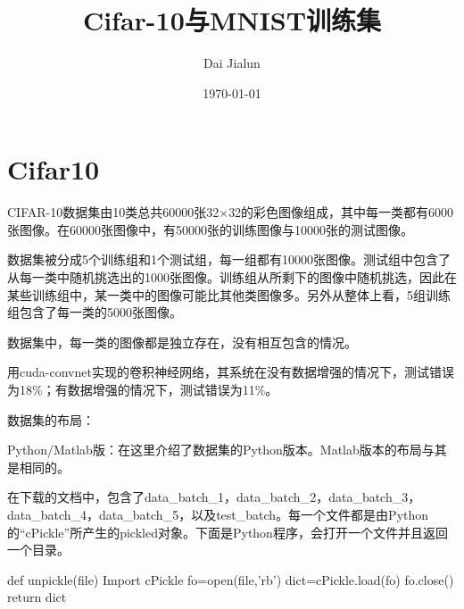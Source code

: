 

\title{\vspace{-2em} Cifar-10与MNIST训练集\\
\normalsize{}}
\author{Dai Jialun}
\date{\vspace{-0.7em} \today \vspace{-0.7em}}
\maketitle\thispagestyle{fancy}
\maketitle
\section{Cifar10}
CIFAR-10数据集由10类总共60000张32$\times$32的彩色图像组成，其中每一类都有6000张图像。在60000张图像中，有50000张的训练图像与10000张的测试图像。

数据集被分成5个训练组和1个测试组，每一组都有10000张图像。测试组中包含了从每一类中随机挑选出的1000张图像。训练组从所剩下的图像中随机挑选，因此在某些训练组中，某一类中的图像可能比其他类图像多。另外从整体上看，5组训练组包含了每一类的5000张图像。

数据集中，每一类的图像都是独立存在，没有相互包含的情况。

用cuda-convnet实现的卷积神经网络，其系统在没有数据增强的情况下，测试错误为18\%；有数据增强的情况下，测试错误为11\%。

数据集的布局：

Python/Matlab版：在这里介绍了数据集的Python版本。Matlab版本的布局与其是相同的。

在下载的文档中，包含了{\scriptsize{data\_batch\_1}}，{\scriptsize{data\_batch\_2}}，{\scriptsize{data\_batch\_3}}，{\scriptsize{data\_batch\_4}}，{\scriptsize{data\_batch\_5}}，以及{\scriptsize{test\_batch}}。每一个文件都是由Python的``cPickle''所产生的pickled对象。下面是Python程序，会打开一个文件并且返回一个目录。

\begin{python}
def unpickle(file)
  Import cPickle
  fo=open(file,'rb')
  dict=cPickle.load(fo)
  fo.close()
  return dict
\end{python} 


